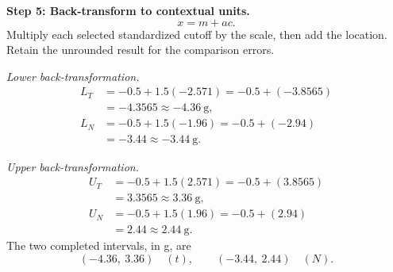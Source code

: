 \begin{enumerate}[leftmargin=*,label=\textbf{\arabic*.},itemsep=12pt,parsep=3pt,topsep=5pt]
\par\noindent\begin{minipage}{\linewidth}
\par\textbf{Step 5: Back-transform to contextual units.}\nopagebreak\enspace \[
x=m+ac.
\]
Multiply each selected standardized cutoff by the scale, then add the location. Retain the unrounded result for the comparison errors.
\par\textit{Lower back-transformation.}
\[
\begin{aligned}L_T&=-0.5+1.5(-2.571)=-0.5+(-3.8565)\\&=-4.3565\approx\boxed{-4.36\ \text{g}},\\L_N&=-0.5+1.5(-1.96)=-0.5+(-2.94)\\&=-3.44\approx\boxed{-3.44\ \text{g}}.\end{aligned}
\]
\par\textit{Upper back-transformation.}
\[
\begin{aligned}U_T&=-0.5+1.5(2.571)=-0.5+(3.8565)\\&=3.3565\approx\boxed{3.36\ \text{g}},\\U_N&=-0.5+1.5(1.96)=-0.5+(2.94)\\&=2.44\approx\boxed{2.44\ \text{g}}.\end{aligned}
\]
The two completed intervals, in g, are
\[
\boxed{(-4.36,\ 3.36)\quad(t)},\qquad\boxed{(-3.44,\ 2.44)\quad(N)}.
\]


\end{minipage}
\end{enumerate}
